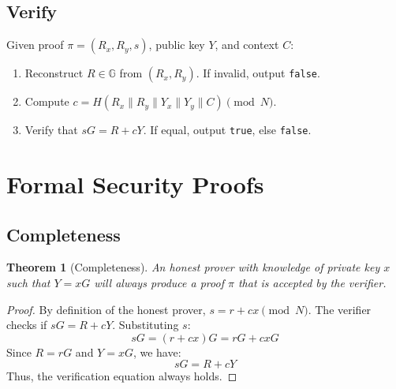 \documentclass[11pt,a4paper]{article}
\newtheorem{theorem}{Theorem}
\begin{document}
\subsection{Verify}
Given proof $\pi = (R_x, R_y, s)$, public key $Y$, and context $C$:
\begin{enumerate}
    \item Reconstruct $R \in \mathbb{G}$ from $(R_x, R_y)$. If invalid, output \texttt{false}.
    \item Compute $c = H(R_x \parallel R_y \parallel Y_x \parallel Y_y \parallel C) \pmod N$.
    \item Verify that $sG = R + cY$. If equal, output \texttt{true}, else \texttt{false}.
\end{enumerate}

\section{Formal Security Proofs}

\subsection{Completeness}
\begin{theorem}[Completeness]
An honest prover with knowledge of private key $x$ such that $Y = xG$ will always produce a proof $\pi$ that is accepted by the verifier.
\end{theorem}
\begin{proof}
By definition of the honest prover, $s = r + cx \pmod N$.
The verifier checks if $sG = R + cY$.
Substituting $s$:
\[ sG = (r + cx)G = rG + cxG \]
Since $R = rG$ and $Y = xG$, we have:
\[ sG = R + cY \]
Thus, the verification equation always holds.
\end{proof}
\end{document}
